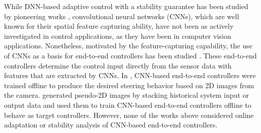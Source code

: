 \documentclass[letterpaper, journal]{IEEEtran}
\begin{document}
While DNN-based adaptive control with a stability guarantee has been studied by pioneering works \cite{DixonDNN, DixonLSTM, DixonPINN}, convolutional neural networks (CNNs), which are well known for their spatial feature capturing ability, have not been as actively investigated in control applications, as they have been in computer vision applications.
Nonetheless, motivated by the feature-capturing capability, the use of CNNs as a basis for end-to-end controllers has been studied \cite{CNNimg2strOutErr, CNNimg2strAngErr, CNNmat2mat, CNNsensorSystemCompare}. These end-to-end controllers determine the control input directly from the sensor data with features that are extracted by CNNs. In \cite{CNNimg2strOutErr, CNNimg2strAngErr}, CNN-based end-to-end controllers were trained offline to produce the desired steering behavior based on 2D images from the camera. \cite{CNNmat2mat, CNNsensorSystemCompare} generated pseudo-2D images by stacking historical system input or output data and used them to train CNN-based end-to-end controllers offline to behave as target controllers.
However, none of the works above considered online adaptation or stability analysis of CNN-based end-to-end controllers. 
\end{document}
